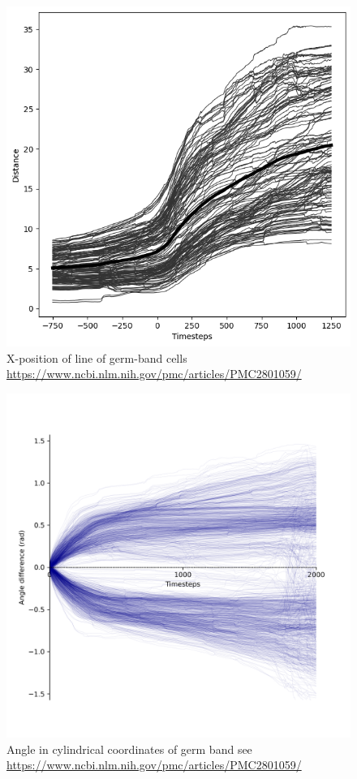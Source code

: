 \begin{figure}[H]
    \centering
    \includegraphics[width=1\linewidth]{chapters/Appendix/germbandMovementQuant.png}
    \caption{X-position of line of germ-band cells \url{https://www.ncbi.nlm.nih.gov/pmc/articles/PMC2801059/}}
    \label{fig:enter-label}
\end{figure}
\begin{figure}[H]
    \centering
    \includegraphics[width=1\linewidth]{chapters/Appendix/the_ring.png}
    \caption{Angle in cylindrical coordinates of germ band see \url{https://www.ncbi.nlm.nih.gov/pmc/articles/PMC2801059/}}
    \label{fig:enter-label}
\end{figure}
